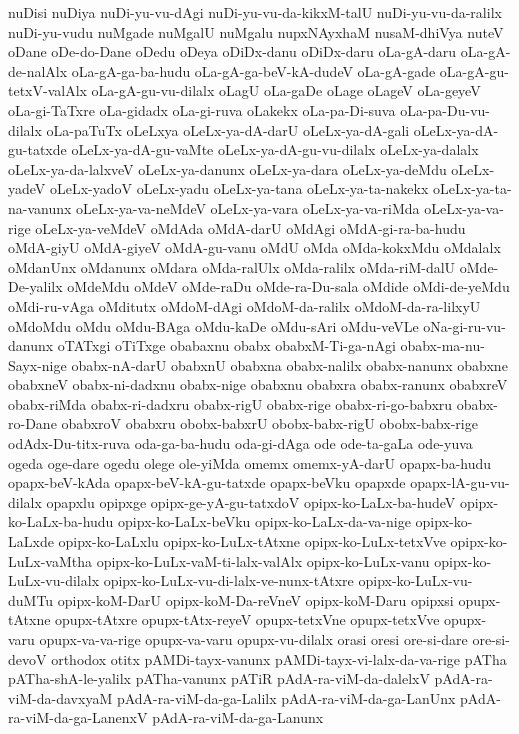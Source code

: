 {nuDisi
nuDiya
nuDi-yu-vu-dAgi
nuDi-yu-vu-da-kikxM-talU
nuDi-yu-vu-da-ralilx
nuDi-yu-vudu
nuMgade
nuMgalU
nuMgalu
nupxNAyxhaM
nusaM-dhiVya
nuteV
oDane
oDe-do-Dane
oDedu
oDeya
oDiDx-danu
oDiDx-daru
oLa-gA-daru
oLa-gA-de-nalAlx
oLa-gA-ga-ba-hudu
oLa-gA-ga-beV-kA-dudeV
oLa-gA-gade
oLa-gA-gu-tetxV-valAlx
oLa-gA-gu-vu-dilalx
oLagU
oLa-gaDe
oLage
oLageV
oLa-geyeV
oLa-gi-TaTxre
oLa-gidadx
oLa-gi-ruva
oLakekx
oLa-pa-Di-suva
oLa-pa-Du-vu-dilalx
oLa-paTuTx
oLeLxya
oLeLx-ya-dA-darU
oLeLx-ya-dA-gali
oLeLx-ya-dA-gu-tatxde
oLeLx-ya-dA-gu-vaMte
oLeLx-ya-dA-gu-vu-dilalx
oLeLx-ya-dalalx
oLeLx-ya-da-lalxveV
oLeLx-ya-danunx
oLeLx-ya-dara
oLeLx-ya-deMdu
oLeLx-yadeV
oLeLx-yadoV
oLeLx-yadu
oLeLx-ya-tana
oLeLx-ya-ta-nakekx
oLeLx-ya-ta-na-vanunx
oLeLx-ya-va-neMdeV
oLeLx-ya-vara
oLeLx-ya-va-riMda
oLeLx-ya-va-rige
oLeLx-ya-veMdeV
oMdAda
oMdA-darU
oMdAgi
oMdA-gi-ra-ba-hudu
oMdA-giyU
oMdA-giyeV
oMdA-gu-vanu
oMdU
oMda
oMda-kokxMdu
oMdalalx
oMdanUnx
oMdanunx
oMdara
oMda-ralUlx
oMda-ralilx
oMda-riM-dalU
oMde-De-yalilx
oMdeMdu
oMdeV
oMde-raDu
oMde-ra-Du-sala
oMdide
oMdi-de-yeMdu
oMdi-ru-vAga
oMditutx
oMdoM-dAgi
oMdoM-da-ralilx
oMdoM-da-ra-lilxyU
oMdoMdu
oMdu
oMdu-BAga
oMdu-kaDe
oMdu-sAri
oMdu-veVLe
oNa-gi-ru-vu-danunx
oTATxgi
oTiTxge
obabaxnu
obabx
obabxM-Ti-ga-nAgi
obabx-ma-nu-Sayx-nige
obabx-nA-darU
obabxnU
obabxna
obabx-nalilx
obabx-nanunx
obabxne
obabxneV
obabx-ni-dadxnu
obabx-nige
obabxnu
obabxra
obabx-ranunx
obabxreV
obabx-riMda
obabx-ri-dadxru
obabx-rigU
obabx-rige
obabx-ri-go-babxru
obabx-ro-Dane
obabxroV
obabxru
obobx-babxrU
obobx-babx-rigU
obobx-babx-rige
odAdx-Du-titx-ruva
oda-ga-ba-hudu
oda-gi-dAga
ode
ode-ta-gaLa
ode-yuva
ogeda
oge-dare
ogedu
olege
ole-yiMda
omemx
omemx-yA-darU
opapx-ba-hudu
opapx-beV-kAda
opapx-beV-kA-gu-tatxde
opapx-beVku
opapxde
opapx-lA-gu-vu-dilalx
opapxlu
opipxge
opipx-ge-yA-gu-tatxdoV
opipx-ko-LaLx-ba-hudeV
opipx-ko-LaLx-ba-hudu
opipx-ko-LaLx-beVku
opipx-ko-LaLx-da-va-nige
opipx-ko-LaLxde
opipx-ko-LaLxlu
opipx-ko-LuLx-tAtxne
opipx-ko-LuLx-tetxVve
opipx-ko-LuLx-vaMtha
opipx-ko-LuLx-vaM-ti-lalx-valAlx
opipx-ko-LuLx-vanu
opipx-ko-LuLx-vu-dilalx
opipx-ko-LuLx-vu-di-lalx-ve-nunx-tAtxre
opipx-ko-LuLx-vu-duMTu
opipx-koM-DarU
opipx-koM-Da-reVneV
opipx-koM-Daru
opipxsi
opupx-tAtxne
opupx-tAtxre
opupx-tAtx-reyeV
opupx-tetxVne
opupx-tetxVve
opupx-varu
opupx-va-va-rige
opupx-va-varu
opupx-vu-dilalx
orasi
oresi
ore-si-dare
ore-si-devoV
orthodox
otitx
pAMDi-tayx-vanunx
pAMDi-tayx-vi-lalx-da-va-rige
pATha
pATha-shA-le-yalilx
pATha-vanunx
pATiR
pAdA-ra-viM-da-dalelxV
pAdA-ra-viM-da-davxyaM
pAdA-ra-viM-da-ga-Lalilx
pAdA-ra-viM-da-ga-LanUnx
pAdA-ra-viM-da-ga-LanenxV
pAdA-ra-viM-da-ga-Lanunx
}
